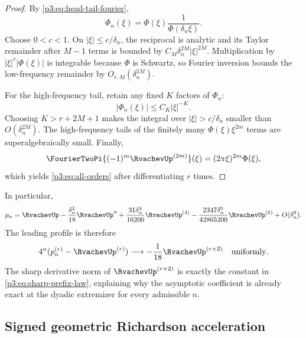 \documentclass[11pt,oneside]{article}
\numberwithin{equation}{section}
\theoremstyle{definition}
\theoremstyle{remark}
\begin{document}
\begin{proof}
By \cref{p3:eq:head-tail-fourier},
\[
 \Phi_n(\xi)=\Phi(\xi)\frac1{\Phi(\delta_n\xi)}.
\]
Choose $0<c<1$.  On $|\xi|\le c/\delta_n$, the reciprocal is analytic and its Taylor
remainder after $M-1$ terms is bounded by
$C_M\delta_n^{2M}|\xi|^{2M}$.  Multiplication by
$|\xi|^r|\Phi(\xi)|$ is integrable because $\Phi$ is Schwartz, so Fourier inversion
bounds the low-frequency remainder by $O_{r,M}(\delta_n^{2M})$.

For the high-frequency tail, retain any fixed $K$ factors of $\Phi_n$:
\[
 |\Phi_n(\xi)|\le C_K|\xi|^{-K}.
\]
Choosing $K>r+2M+1$ makes the integral over $|\xi|>c/\delta_n$ smaller than
$O(\delta_n^{2M})$.  The high-frequency tails of the finitely many $\Phi(\xi)\xi^{2m}$
terms are superalgebraically small.  Finally,
\[
 \FourierTwoPi{(-1)^m\RvachevUp^{(2m)}}(\xi)
 =(2\pi\xi)^{2m}\Phi(\xi),
\]
which yields \cref{p3:eq:all-orders} after differentiating $r$ times.
\end{proof}

In particular,
\begin{equation}
 p_n=\RvachevUp-\frac{\delta_n^2}{18}\RvachevUp''
 +\frac{31\delta_n^4}{16200}\RvachevUp^{(4)}
 -\frac{2347\delta_n^6}{42865200}\RvachevUp^{(6)}
 +O(\delta_n^8).
 \label{p3:eq:first-expansion}
\end{equation}
The leading profile is therefore
\begin{equation}
 4^n(p_n^{(r)}-\RvachevUp^{(r)})
 \longrightarrow-\frac1{18}\RvachevUp^{(r+2)}
 \quad\text{uniformly}.
 \label{p3:eq:leading-profile}
\end{equation}
The sharp derivative norm of $\RvachevUp^{(r+2)}$ is exactly the constant in
\cref{p3:eq:sharp-prefix-law}, explaining why the asymptotic coefficient is already exact
at the dyadic extremizer for every admissible $n$.

\subsection{Signed geometric Richardson acceleration}
\end{document}
